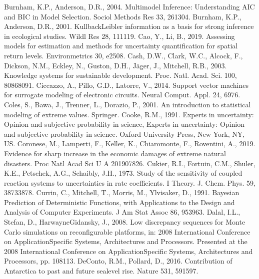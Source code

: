 \documentclass[letterpaper,10pt,english]{sphinxmanual}
\begin{document}
Burnham, K.P., Anderson, D.R., 2004. Multimodel Inference: Understanding AIC and BIC in Model Selection. Sociol Methods Res 33, 261\textendash{}304. 
Burnham, K.P., Anderson, D.R., 2001. Kullback\sphinxhyphen{}Leibler information as a basis for strong inference in ecological studies. Wildl Res 28, 111\textendash{}119. 
Cao, Y., Li, B., 2019. Assessing models for estimation and methods for uncertainty quantification for spatial return levels. Environmetrics 30, e2508.
Cash, D.W., Clark, W.C., Alcock, F., Dickson, N.M., Eckley, N., Guston, D.H., Jäger, J., Mitchell, R.B., 2003. Knowledge systems for sustainable development. Proc. Natl. Acad. Sci. 100, 8086\textendash{}8091.
Ciccazzo, A., Pillo, G.D., Latorre, V., 2014. Support vector machines for surrogate modeling of electronic circuits. Neural Comput. Appl. 24, 69\textendash{}76. 
Coles, S., Bawa, J., Trenner, L., Dorazio, P., 2001. An introduction to statistical modeling of extreme values. Springer.
Cooke, R.M., 1991. Experts in uncertainty:  Opinion and subjective probability in science, Experts in uncertainty:  Opinion and subjective probability in science. Oxford University Press, New York, NY, US.
Coronese, M., Lamperti, F., Keller, K., Chiaromonte, F., Roventini, A., 2019. Evidence for sharp increase in the economic damages of extreme natural disasters. Proc Natl Acad Sci U A 201907826. 
Cukier, R.I., Fortuin, C.M., Shuler, K.E., Petschek, A.G., Schaibly, J.H., 1973. Study of the sensitivity of coupled reaction systems to uncertainties in rate coefficients. I Theory. J. Chem. Phys. 59, 3873\textendash{}3878. 
Currin, C., Mitchell, T., Morris, M., Ylvisaker, D., 1991. Bayesian Prediction of Deterministic Functions, with Applications to the Design and Analysis of Computer Experiments. J Am Stat Assoc 86, 953\textendash{}963. 
Dalal, I.L., Stefan, D., Harwayne\sphinxhyphen{}Gidansky, J., 2008. Low discrepancy sequences for Monte Carlo simulations on reconfigurable platforms, in: 2008 International Conference on Application\sphinxhyphen{}Specific Systems, Architectures and Processors. Presented at the 2008 International Conference on Application\sphinxhyphen{}Specific Systems, Architectures and Processors, pp. 108\textendash{}113. 
DeConto, R.M., Pollard, D., 2016. Contribution of Antarctica to past and future sea\sphinxhyphen{}level rise. Nature 531, 591\textendash{}597. 
\end{document}
